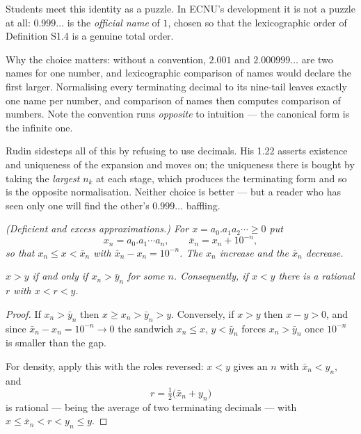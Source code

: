 \begin{pitfall}[$0.999\ldots = 1$ is a convention, not a paradox]
Students meet this identity as a puzzle. In ECNU's development it is not a
puzzle at all: $0.999\ldots$ is the \emph{official name} of $1$, chosen so
that the lexicographic order of Definition S1.4 is a genuine total order.

Why the choice matters: without a convention, $2.001$ and $2.000999\ldots$
are two names for one number, and lexicographic comparison of names would
declare the first larger. Normalising every terminating decimal to its
nine-tail leaves exactly one name per number, and comparison of names then
computes comparison of numbers. Note the convention runs \emph{opposite} to
intuition --- the canonical form is the infinite one.

Rudin sidesteps all of this by refusing to use decimals. His 1.22 asserts
existence and uniqueness of the expansion and moves on; the uniqueness there
is bought by taking the \emph{largest} $n_k$ at each stage, which produces
the terminating form and so is the opposite normalisation. Neither choice is
better --- but a reader who has seen only one will find the other's
$0.999\ldots$ baffling.
\end{pitfall}

\emph{(Deficient and excess approximations.) For $x = a_0.a_1a_2\cdots \ge 0$
put}
\[ x_n = a_0.a_1\cdots a_n, \qquad \bar x_n = x_n + 10^{-n} , \]
\emph{so that $x_n \le x < \bar x_n$ with $\bar x_n - x_n = 10^{-n}$. The
$x_n$ increase and the $\bar x_n$ decrease.}

\emph{$x > y$ if and only if $x_n > \bar y_n$ for some $n$. Consequently, if
$x < y$ there is a rational $r$ with $x < r < y$.}

\begin{proof}
If $x_n > \bar y_n$ then $x \ge x_n > \bar y_n > y$. Conversely, if $x>y$
then $x - y > 0$, and since $\bar x_n - x_n = 10^{-n} \to 0$ the sandwich
$x_n \le x$, $y < \bar y_n$ forces $x_n > \bar y_n$ once $10^{-n}$ is smaller
than the gap.

For density, apply this with the roles reversed: $x<y$ gives an $n$ with
$\bar x_n < y_n$, and
\[ r = \tfrac12\bigl(\bar x_n + y_n\bigr) \]
is rational --- being the average of two terminating decimals --- with
$x \le \bar x_n < r < y_n \le y$.
\end{proof}

